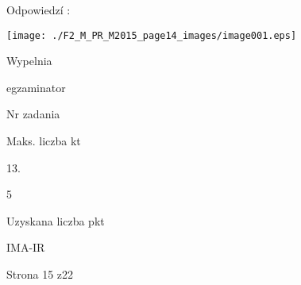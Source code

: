 \documentclass[a4paper,12pt]{article}
\begin{document}
Odpowiedzí :
\begin{center}
\texttt{[image: ./F2\_M\_PR\_M2015\_page14\_images/image001.eps]}
\end{center}
Wypelnia

egzaminator

Nr zadania

Maks. liczba kt

13.

5

Uzyskana liczba pkt

IMA-IR

Strona 15 z22
\end{document}
